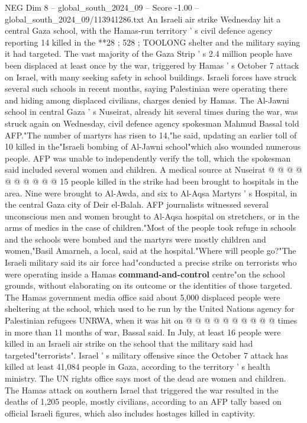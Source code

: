 \begin{textsample}{NEG Dim 8 – global\_south\_2024\_09 – Score -1.00 – global\_south\_2024\_09/113941286.txt}  \label{ex:f8_neg_209}
An Israeli air strike Wednesday hit a central Gaza school, with the Hamas-run territory ' s civil defence agency reporting 14 killed in the **28 ; 528 ; TOOLONG shelter and the military saying it had targeted.
The vast majority of the Gaza Strip ' s 2.4 million people have been displaced at least once by the war, triggered by Hamas ' s October 7 attack on Israel, with many seeking safety in school buildings.
Israeli forces have struck several such schools in recent months, saying Palestinian were operating there and hiding among displaced civilians, charges denied by Hamas.
The Al-Jawni school in central Gaza ' s Nuseirat, already hit several times during the war, was struck again on Wednesday, civil defence agency spokesman Mahmud Bassal told AFP."The number of martyrs has risen to 14,"he said, updating an earlier toll of 10 killed in the"Israeli bombing of Al-Jawni school"which also wounded numerous people.
AFP was unable to independently verify the toll, which the spokesman said included several women and children.
A medical source at Nuseirat @ @ @ @ @ @ @ @ @ @ 15 people killed in the strike had been brought to hospitals in the area.
Nine were brought to Al-Awda, and six to Al-Aqsa Martyrs ' s Hospital, in the central Gaza city of Deir el-Balah.
AFP journalists witnessed several unconscious men and women brought to Al-Aqsa hospital on stretchers, or in the arms of medics in the case of children."Most of the people took refuge in schools and the schools were bombed and the martyrs were mostly children and women,"Basil Amarneh, a local, said at the hospital."Where will people go?"The Israeli military said its air force had"conducted a precise strike on terrorists who were operating inside a Hamas \textbf{command-and-control} centre"on the school grounds, without elaborating on its outcome or the identities of those targeted.
The Hamas government media office said about 5,000 displaced people were sheltering at the school, which used to be run by the United Nations agency for Palestinian refugees UNRWA, when it was hit on @ @ @ @ @ @ @ @ @ @ times in more than 11 months of war, Bassal said.
In July, at least 16 people were killed in an Israeli air strike on the school that the military said had targeted"terrorists".
Israel ' s military offensive since the October 7 attack has killed at least 41,084 people in Gaza, according to the territory ' s health ministry.
The UN rights office says most of the dead are women and children.
The Hamas attack on southern Israel that triggered the war resulted in the deaths of 1,205 people, mostly civilians, according to an AFP tally based on official Israeli figures, which also includes hostages killed in captivity.

\end{textsample}
